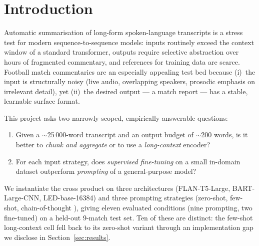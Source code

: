\documentclass[10pt,a4paper]{article}
\begin{document}
\section{Introduction}

Automatic summarisation of long-form spoken-language transcripts is a stress test for modern sequence-to-sequence models: inputs routinely exceed the context window of a standard transformer, outputs require selective abstraction over hours of fragmented commentary, and references for training data are scarce. Football match commentaries are an especially appealing test bed because (i)~the input is structurally noisy (live audio, overlapping speakers, prosodic emphasis on irrelevant detail), yet (ii)~the desired output --- a match report --- has a stable, learnable surface format.

This project asks two narrowly-scoped, empirically answerable questions:

\begin{enumerate}[leftmargin=*,itemsep=2pt,topsep=2pt]
\item Given a $\sim$25\,000-word transcript and an output budget of $\sim$200 words, is it better to \emph{chunk and aggregate} or to use a \emph{long-context} encoder?
\item For each input strategy, does \emph{supervised fine-tuning} on a small in-domain dataset outperform \emph{prompting} of a general-purpose model?
\end{enumerate}

We instantiate the cross product on three architectures (FLAN-T5-Large, BART-Large-CNN, LED-base-16384) and three prompting strategies (zero-shot, few-shot, chain-of-thought \citep{wei2022cot}), giving eleven evaluated conditions (nine prompting, two fine-tuned) on a held-out 9-match test set. Ten of these are distinct: the few-shot long-context cell fell back to its zero-shot variant through an implementation gap we disclose in Section~\ref{sec:results}.
\end{document}
